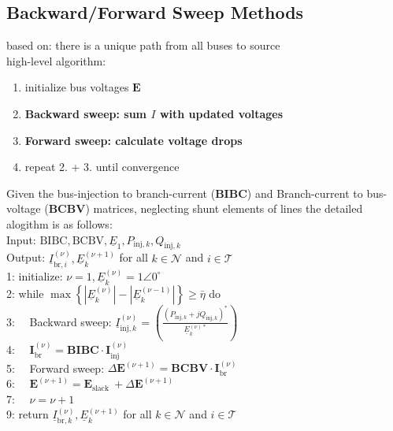 \documentclass[a4paper,10pt,landscape]{scrartcl}
\begin{document}
\begin{multicols*}{3}
\subsection{Backward/Forward Sweep Methods}
based on: there is a unique path from all buses to source \\
high-level algorithm:
\begin{enumerate}
    \item initialize bus voltages $\mathbf{E}$
    \item \textbf{Backward sweep: sum $I$ with updated voltages}
    \item \textbf{Forward sweep: calculate voltage drops}
    \item repeat 2. + 3. until convergence
\end{enumerate}
Given the bus-injection to branch-current (\textbf{BIBC}) and Branch-current to bus-voltage (\textbf{BCBV}) matrices, neglecting shunt elements of lines the detailed alogithm is as follows: \\
Input: $\mathrm{BIBC}, \mathrm{BCBV}, \underline{E}_1, P_{\mathrm{inj}, k}, Q_{\mathrm{inj}, k}$ \\
Output: $\underline{I}_{\mathrm{br}, i}^{(\nu)}, \underline{E}_k^{(\nu+1)}$ for all $k \in \mathcal{N}$ and $i \in \mathcal{T}$ \\
1: initialize: $\nu=1, \underline{E}_k^{(\nu)}=1 \angle 0^{\circ}$ \\
2: while $\max \left\{\left|\underline{E}_k^{(\nu)}\right|-\left|\underline{E}_k^{(\nu-1)}\right|\right\} \geq \bar{\eta}$ do \\
3: $\quad$Backward sweep: $\underline{I}_{\mathrm{inj}, k}^{(\nu)}=\left(\frac{\left(P_{\mathrm{inj}, k}+j Q_{\mathrm{inj}, k}\right)^*}{\underline{E}_k^{(\nu) *}}\right)$ \\
4: $\quad \mathbf{I}_{\mathrm{br}}^{(\nu)}=\mathbf{BIBC} \cdot \mathbf{I}_{\mathrm{inj}}^{(\nu)}$ \\
5: $\quad$Forward sweep: $\Delta \mathbf{E}^{(\nu+1)}=\mathbf{B C B V} \cdot \mathbf{I}_{\mathrm{b r}}^{(\nu)}$ \\
6: $\quad \mathbf{E}^{(\nu+1)}=\mathbf{E}_{\text {slack }}+\Delta \mathbf{E}^{(\nu+1)}$ \\
7: $\quad \nu=\nu+1$ \\
9: return $\underline{I}_{\mathrm{br}, k}^{(\nu)}, \underline{E}_k^{(\nu+1)}$ for all $k \in \mathcal{N}$ and $i \in \mathcal{T}$ \\


\end{multicols*}
\end{document}
